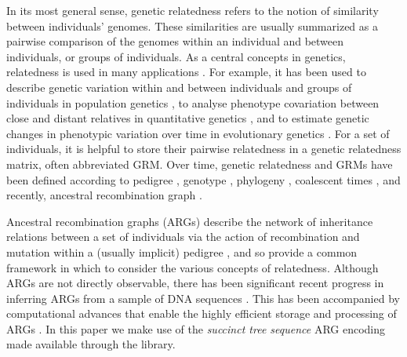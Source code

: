 

In its most general sense, genetic relatedness refers to the notion of
similarity between individuals' genomes.
%
These similarities are usually summarized as a pairwise comparison of the
genomes within an individual and between individuals, or groups of
individuals.
%
As a central concepts in genetics, relatedness is used in many
applications \citep{weir2006genetic, speed2015relatedness}.
%
For example, it has been used to describe genetic variation within and between individuals
and groups of individuals in population genetics
\citep{crow2009introduction, charlesworth2010elements},
to analyse phenotype covariation between close and distant relatives in
quantitative genetics \citep{falconer1996introduction, lynch1998genetics},
and to estimate genetic changes in phenotypic variation over time in
evolutionary genetics \citep{walsh2018evolution, arnold2023evolutionary}.
%
For a set of individuals, it is helpful to store their pairwise relatedness in
a genetic relatedness matrix, often abbreviated GRM.
%
Over time, genetic relatedness and GRMs have been defined according to
pedigree \citep{fisher1919correlation, wright1922coefficients},
genotype \citep{cotterman1940calculus, malecot1948mathematiques, malecot1969mathemathics, vanraden2008efficient},
phylogeny \citep{felsenstein1985phylogenies,lynch1991methods},
coalescent times \citep{slatkin1991inbreeding}, and
recently, ancestral recombination graph \citep{tsambos2022efficient, fan2022genealogical, zhang2023biobank, Tang2025Genealogy}.
%
    
Ancestral recombination graphs (ARGs) 
describe the network of inheritance relations between a set of individuals
via the action of recombination and mutation within a (usually implicit) pedigree
\citep{brandt2024promise, lewanski2024era, wong2023general, nielsen2024inference},
and so provide a common framework in which to consider
the various concepts of relatedness.
%
Although ARGs are not directly observable,
there has been significant recent progress in inferring ARGs from a sample of DNA sequences
\citep{rasmussen2014genome,speidel2019method, kelleher2019inferring, zhang2023biobank, deng2024robust, gunnarsson2024scalable}.
%
This has been accompanied by computational advances that enable
the highly efficient storage and processing of ARGs
\citep{kelleher2016efficient, zhu2024variance, dehaas2024enabling}.
%
In this paper we make use of the \textit{succinct tree sequence} 
ARG encoding \citep{ralph2020efficiently, wong2023general}
made available through the \tskit{} library.

